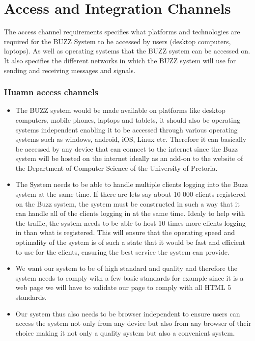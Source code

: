 \documentclass[a4paper]{article}
\begin{document}
\section{Access and Integration Channels}
The access channel requirements specifies what platforms and technologies are required for the BUZZ System to be accessed by users (desktop computers, laptops). As well as operating systems that the BUZZ system can be accessed on. It also specifies the different networks in which the BUZZ system will use for sending and receiving messages and signals.

\subsubsection{Huamn access channels }
\begin{itemize}
\item The BUZZ system would be made available on platforms like desktop computers, mobile phones, laptops and tablets, it should also be operating systems independent enabling it to be accessed through various operating systems such as  windows, android, iOS, Linux etc. Therefore it can basically be accessed by any device that can connect to the internet since the Buzz system will be hosted on the internet ideally as an add-on to the website of the Department of Computer Science of the University of Pretoria. 
\item The System needs to be able to handle multiple clients logging into the Buzz system at the same time. If there are lets say about 10 000 clients registered on the Buzz system, the system must be constructed in such a way that it can handle all of the clients logging in at the same time. Idealy to help with the traffic, the system needs to be able to host 10 times more clients logging in than what is registered. This will ensure that the operating speed and optimality of the system is of such a state that it would be fast and efficient to use for the clients, ensuring the best service the system can provide.
\item We want our system to be of high standard and quality and therefore the system needs to comply with a few basic standards for example  since it is a web page we will have to validate our page to comply with all HTML 5 standards. 
\item Our system thus also needs to be browser independent to ensure users can access the system not only from any device but also from any browser of their choice making it not only a quality system but also a convenient system.


\end{itemize}
\end{document}
